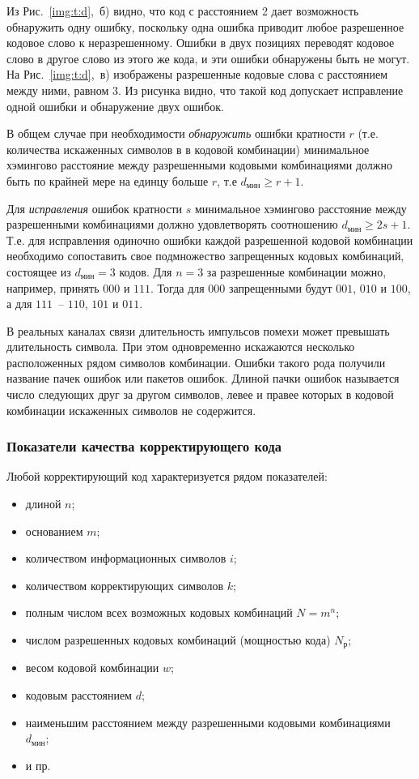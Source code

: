 \documentclass[12pt,a4paper]{article}
\begin{document}
  Из Рис.~\ref{img:t:d},~б) видно, что код с расстоянием 2 дает возможность обнаружить  одну  ошибку,  поскольку  одна  ошибка  приводит  любое  разрешенное кодовое слово к неразрешенному. Ошибки в двух позициях переводят кодовое слово в другое слово из этого же кода, и эти  ошибки обнаружены  быть  не  могут.  На  Рис.~\ref{img:t:d},~в) изображены  разрешенные  кодовые слова с расстоянием между ними, равном 3. Из рисунка видно, что такой код  допускает  исправление  одной  ошибки  и  обнаружение  двух  ошибок.
   
   В общем случае при необходимости \emph{обнаружить} ошибки кратности $r$ (т.е. количества искаженных символов в в кодовой комбинации) минимальное хэмингово расстояние между разрешенными кодовыми комбинациями должно быть по крайней мере на единцу больше $r$, т.е $d_{\text{мин}}\geq r+1$.
   
   Для \emph{исправления} ошибок кратности $s$ минимальное хэмингово расстояние между разрешенными комбинациями должно удовлетворять соотношению $d_{\text{мин}}\geq 2s+1$. Т.е. для исправления одиночно ошибки каждой разрешенной кодовой комбинации необходимо сопоставить свое подмножество запрещенных кодовых комбинаций, состоящее из $d_{\text{мин}}=3$ кодов. Для $n=3$ за разрешенные комбинации можно, например, принять $000$ и $111$. Тогда для $000$ запрещенными будут $001$, $010$ и $100$, а для $111$~-- $110$, $101$ и $011$.
   
   В реальных каналах связи длительность импульсов помехи может превышать длительность символа. При этом одновременно искажаются несколько расположенных рядом символов комбинации. Ошибки такого рода получили название пачек ошибок или пакетов ошибок. Длиной пачки ошибок называется число следующих друг за другом символов, левее и правее которых в кодовой комбинации искаженных символов не содержится.
   
\subsubsection{Показатели качества корректирующего кода}
  
  Любой корректирующий код характеризуется рядом показателей: 
  \begin{itemize}
    \item длиной $n$;
    \item основанием $m$;
    \item количеством информационных символов $i$;
    \item количеством корректирующих символов $k$;
    \item полным числом всех возможных кодовых комбинаций $N=m^n$;
    \item числом разрешенных кодовых комбинаций (мощностью кода) $N_\text{р}$;
    \item весом кодовой комбинации $w$;
    \item кодовым расстоянием $d$;
    \item наименьшим расстоянием между разрешенными кодовыми комбинациями $d_\text{мин}$;
    \item и пр.
  \end{itemize}
  
\end{document}

